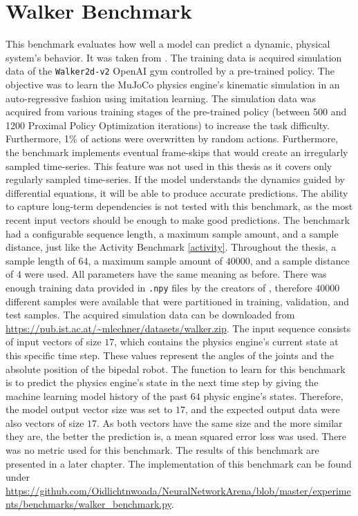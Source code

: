 \documentclass[draft,final]{vutinfth} %
\begin{document}
    \section{Walker Benchmark} \label{walker}
    This benchmark evaluates how well a model can predict a dynamic, physical system's behavior. It was taken from \cite{ODELSTM}.
    The training data is acquired simulation data of the \texttt{Walker2d-v2} OpenAI gym \cite{OpenAIGym} controlled by a pre-trained policy.
    The objective was to learn the MuJoCo physics engine's kinematic simulation \cite{MuJoCo} in an auto-regressive fashion using imitation learning.
    The simulation data was acquired from various training stages of the pre-trained policy (between 500 and 1200 Proximal Policy Optimization iterations) to increase the task difficulty. Furthermore, 1\% of actions were overwritten by random actions.
    Furthermore, the benchmark implements eventual frame-skips that would create an irregularly sampled time-series.
    This feature was not used in this thesis as it covers only regularly sampled time-series.
    If the model understands the dynamics guided by differential equations, it will be able to produce accurate predictions.
    The ability to capture long-term dependencies is not tested with this benchmark, as the most recent input vectors should be enough to make good predictions.
    The benchmark had a configurable sequence length, a maximum sample amount, and a sample distance, just like the Activity Benchmark \ref{activity}.
    Throughout the thesis, a sample length of $64$, a maximum sample amount of $40000$, and a sample distance of $4$ were used.
    All parameters have the same meaning as before.
    There was enough training data provided in \texttt{.npy} files by the creators of \cite{ODELSTM}, therefore $40000$ different samples were available that were partitioned in training, validation, and test samples.
    The acquired simulation data can be downloaded from \url{https://pub.ist.ac.at/~mlechner/datasets/walker.zip}.
    The input sequence consists of input vectors of size $17$, which contains the physics engine's current state at this specific time step.
    These values represent the angles of the joints and the absolute position of the bipedal robot.
    The function to learn for this benchmark is to predict the physics engine's state in the next time step by giving the machine learning model history of the past $64$ physic engine's states.
    Therefore, the model output vector size was set to $17$, and the expected output data were also vectors of size $17$.
    As both vectors have the same size and the more similar they are, the better the prediction is, a mean squared error loss was used.
    There was no metric used for this benchmark.
    The results of this benchmark are presented in a later chapter.
    The implementation of this benchmark can be found under \url{https://github.com/Oidlichtnwoada/NeuralNetworkArena/blob/master/experiments/benchmarks/walker_benchmark.py}.
\end{document}
